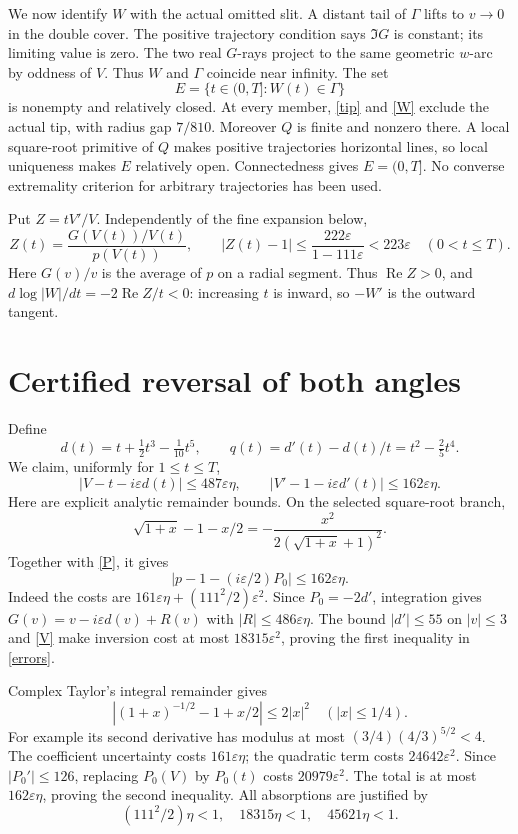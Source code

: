 \documentclass[10pt]{article}
\newcommand{\eps}{\varepsilon}
\newcommand{\Rea}{\operatorname{Re}}
\begin{document}
We now identify \(W\) with the actual omitted slit.
A distant tail of \(\Gamma\) lifts to \(v\to0\) in the double cover.
The positive trajectory condition says \(\Im G\) is constant; its
limiting value is zero. The two real \(G\)-rays project to the same
geometric \(w\)-arc by oddness of \(V\). Thus \(W\) and \(\Gamma\)
coincide near infinity.
The set
\[
             E=\{t\in(0,T]:W(t)\in\Gamma\}
\]
is nonempty and relatively closed. At every member, \eqref{tip}
and \eqref{W} exclude the actual tip, with radius gap \(7/810\).
Moreover \(Q\) is finite and nonzero there. A local square-root
primitive of \(Q\) makes positive trajectories horizontal lines,
so local uniqueness makes \(E\) relatively open. Connectedness
gives \(E=(0,T]\). No converse extremality criterion for arbitrary
trajectories has been used.

Put \(Z=tV'/V\). Independently of the fine expansion below,
\begin{equation}\label{orientation}
 Z(t)=\frac{G(V(t))/V(t)}{p(V(t))},\qquad
 |Z(t)-1|\le\frac{222\eps}{1-111\eps}<223\eps
                    \quad(0<t\le T).
\end{equation}
Here \(G(v)/v\) is the average of \(p\) on a radial segment.
Thus \(\Rea Z>0\), and
\(d\log|W|/dt=-2\Rea Z/t<0\): increasing \(t\) is inward,
so \(-W'\) is the outward tangent.

\section{Certified reversal of both angles}
Define
\[
 d(t)=t+\tfrac12t^3-\tfrac1{10}t^5,\qquad
 q(t)=d'(t)-d(t)/t=t^2-\tfrac25t^4 .
\]
We claim, uniformly for \(1\le t\le T\),
\begin{equation}\label{errors}
 |V-t-i\eps d(t)|\le487\eps\eta,\qquad
 |V'-1-i\eps d'(t)|\le162\eps\eta .
\end{equation}
Here are explicit analytic remainder bounds.
On the selected square-root branch,
\[
 \sqrt{1+x}-1-x/2=-\frac{x^2}{2(\sqrt{1+x}+1)^2}.
\]
Together with \eqref{P}, it gives
\[
 |p-1-(i\eps/2)P_0|\le162\eps\eta.
\]
Indeed the costs are \(161\eps\eta+(111^2/2)\eps^2\).
Since \(P_0=-2d'\), integration gives
\(G(v)=v-i\eps d(v)+R(v)\) with \(|R|\le486\eps\eta\).
The bound \(|d'|\le55\) on \(|v|\le3\) and \eqref{V}
make inversion cost at most \(18315\eps^2\), proving the first
inequality in \eqref{errors}.

Complex Taylor's integral remainder gives
\[
 |(1+x)^{-1/2}-1+x/2|\le2|x|^2\quad(|x|\le1/4).
\]
For example its second derivative has modulus at most
\((3/4)(4/3)^{5/2}<4\).
The coefficient uncertainty costs \(161\eps\eta\); the quadratic
term costs \(24642\eps^2\). Since \(|P_0'|\le126\), replacing
\(P_0(V)\) by \(P_0(t)\) costs \(20979\eps^2\).
The total is at most \(162\eps\eta\), proving the second inequality.
All absorptions are justified by
\[
 (111^2/2)\eta<1,\quad18315\eta<1,\quad45621\eta<1.
\]
\end{document}
